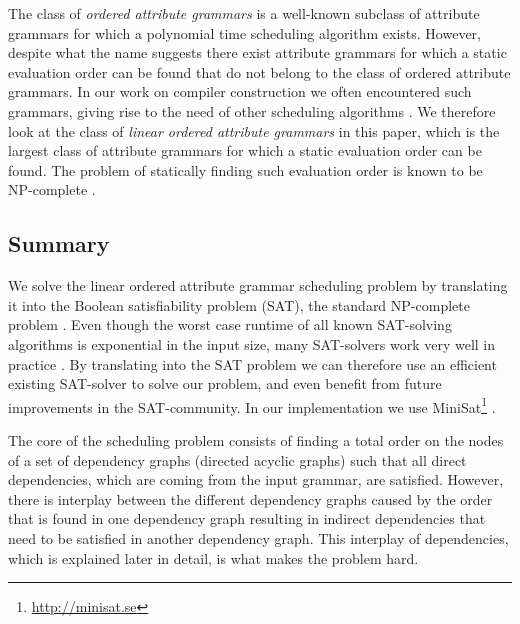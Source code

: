 \documentclass{llncs}
\begin{document}
The class of \emph{ordered attribute grammars} \cite{kastens80} is a well-known subclass of attribute grammars for which a polynomial time scheduling algorithm exists. However, despite what the name suggests there exist attribute grammars for which a static evaluation order can be found that do not belong to the class of ordered attribute grammars. In our work on compiler construction we often encountered such grammars, giving rise to the need of other scheduling algorithms \cite{bransen2012,Binsbergen:2015}. We therefore look at the class of \emph{linear ordered attribute grammars} in this paper, which is the largest class of attribute grammars for which a static evaluation order can be found. The problem of statically finding such evaluation order is known to be NP-complete \cite{engelfriet82}.

\subsection{Summary}
We solve the linear ordered attribute grammar scheduling problem by translating it into the Boolean satisfiability problem (SAT), the standard NP-complete problem \cite{Cook:1971}. Even though the worst case runtime of all known SAT-solving algorithms is exponential in the input size, many SAT-solvers work very well in practice \cite{sat-practice}. By translating into the SAT problem we can therefore use an efficient existing SAT-solver to solve our problem, and even benefit from future improvements in the SAT-community. In our implementation we use MiniSat\footnote{\url{http://minisat.se}} \cite{Een:2004}.

The core of the scheduling problem consists of finding a total order on the nodes of a set of dependency graphs (directed acyclic graphs) such that all direct dependencies, which are coming from the input grammar, are satisfied. However, there is interplay between the different dependency graphs caused by the order that is found in one dependency graph resulting in indirect dependencies that need to be satisfied in another dependency graph. This interplay of dependencies, which is explained later in detail, is what makes the problem hard.
\end{document}
